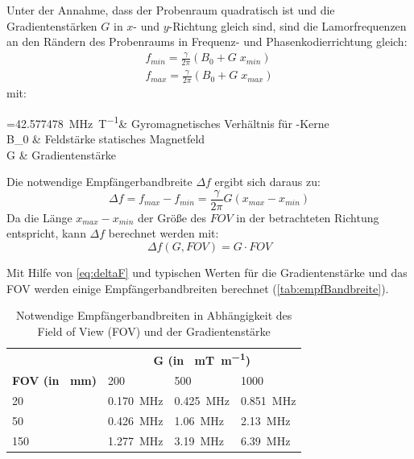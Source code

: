 Unter der Annahme, dass der Probenraum quadratisch ist und die Gradientenstärken $G$ in $x$- und $y$-Richtung gleich sind, sind die Lamorfrequenzen an den Rändern des Probenraums in Frequenz- und Phasenkodierrichtung gleich:
\begin{subequations}
	\begin{align}
	f_{min}=\frac{\gamma}{2\pi} (B_0+G\; x_{min}) \\
	f_{max}=\frac{\gamma}{2\pi} (B_0+G\; x_{max})
	\end{align}
\end{subequations}
mit:
\begin{with}
	\frac{\gamma}{2\pi} =\SI{42.577478}{\mega\hertz\per\tesla}& Gyromagnetisches Verhältnis für -Kerne \\
	B_0  & Feldstärke statisches Magnetfeld \\
	G  & Gradientenstärke \\
\end{with}

Die notwendige Empfängerbandbreite $\Delta f$ ergibt sich daraus zu:
\begin{equation}
\Delta f = f_{max}-f_{min} = \frac{\gamma}{2\pi} G (x_{max}-x_{min})
\end{equation}
Da die Länge $x_{max}-x_{min}$ der Größe des $FOV$ in der betrachteten Richtung entspricht, kann $\Delta f$ berechnet werden mit:
\begin{equation}
\label{eq:deltaF}
\Delta f(G, FOV) = G \cdot FOV
\end{equation}

Mit Hilfe von \autoref{eq:deltaF} und typischen Werten für die Gradientenstärke und das FOV werden einige Empfängerbandbreiten berechnet (\autoref{tab:empfBandbreite}).

\begin{table}[H]
	\centering
	\caption[Berechnung Empfängerbandbreite]{Notwendige Empfängerbandbreiten in Abhängigkeit des Field of View (FOV) und der Gradientenstärke}
	\label{tab:empfBandbreite}
	\begin{tabular}{llll}
		\toprule
		& \multicolumn{3}{c}{\textbf{G (in \SI{}{\milli\tesla\per\meter})}} \\ \cmidrule{2-4}
		\textbf{FOV (in \SI{}{\mm})}& 200 & 500 & 1000 \\
		20 & \SI{0.170}{\mega\hertz} & \SI{0.425}{\mega\hertz} & \SI{0.851}{\mega\hertz} \\
		50 & \SI{0.426}{\mega\hertz} & \SI{1.06}{\mega\hertz} & \SI{2.13}{\mega\hertz} \\
		150 & \SI{1.277}{\mega\hertz} & \SI{3.19}{\mega\hertz} & \SI{6.39}{\mega\hertz} \\
		\bottomrule
	\end{tabular}
\end{table}

